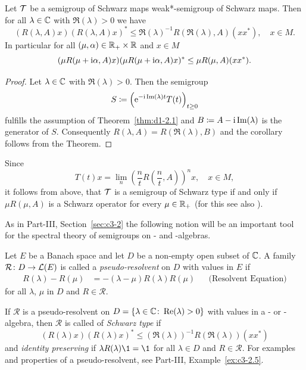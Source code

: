 \begin{corollary}\label{cor:d1-2.2}
Let $ \mathcal{T} $ be a semigroup of Schwarz maps \resp weak*-semigroup of Schwarz maps.
Then for all $ \lambda \in \mathbb{C} $ with $ \Re(\lambda)  > 0 $ we have
\[
	\left( R(\lambda,A)x \right) \left( R(\lambda,A)x \right)^{*} 
		\leq \Re(\lambda)^{-1} R(\Re(\lambda),A)(xx^{*}), \quad x \in M.
\]
In particular for all $ (\mu,\alpha) \in \mathbb{R}_{+} \times \mathbb{R} $ and $ x \in M $
\[
(\mu R(\mu + \im \alpha,A)x)(\mu R(\mu + \im \alpha,A)x)^{*} \leq \mu R(\mu,A)(xx^{*}).
\]
\end{corollary}
\begin{proof}
Let $ \lambda \in \mathbb{C} $ with $ \Re(\lambda) > 0 $.
Then the semigroup
\[
S \coloneq \left(\eu^{- \im \Im(\lambda) t}T(t) \right)_{t \geq 0}
\]
fulfills the assumption of Theorem~\ref{thm:d1-2.1} and $ B \coloneq A - \mathrm{i} \mathop{}\!\mathrm{Im}(\lambda) $ is the generator of\/ $ S $.
Consequently $ R(\lambda,A) = R(\Re(\lambda),B) $ and the corollary follows from the Theorem.
\end{proof}
\begin{remark}\label{rem:d1-2.3}
Since 
%
\[
	T(t)x = \lim_{n} \left( \frac{n}{t} R\left(\frac{n}{t}, A\right) \right)^{n} x , \quad x \in M , 
\]
%
it follows from above, that $ \mathcal{T} $ is a semigroup of Schwarz type if and only if\/ $ \mu R( \mu, A) $ is a Schwarz operator for every $ \mu \in \mathbb{R}_{+} $ (for this see also \textcite{brattelirobinson:1981}).
\end{remark}
As in Part-III, Section~\ref{sec:c3-2}  the following notion will be an important tool for the spectral theory of semigroups on \CA- and \WA-algebras.
\begin{definition}\label{def:d1-2.4}
Let $E$ be a Banach space and let $D$ be a non-empty open subset of\/ $\mathbb{C}$.
A family $ \mathcal{R} \colon D \to \mathcal{L}(E) $ is called a \emph{pseudo-resolvent} on $ D $ with values in $ E $ if
\begin{align*}
	R(\lambda) - R(\mu) &= -(\lambda - \mu)R(\lambda)R(\mu) &&\text{(Resolvent Equation)}
\end{align*}
for all $ \lambda $, $ \mu $ in $ D $ and $ R \in \mathcal{R} $.
\end{definition}
If\/ $ \mathcal{R} $ is a {pseudo-resolvent} on $ D = \{\lambda \in \mathbb{C} \colon \mathop{}\!\mathrm{Re}(\lambda) > 0\} $ with values in a \CA- or \WA-algebra, then $ \mathcal{R} $ is called of \emph{Schwarz type} 
if
\[
	(R(\lambda)x)(R(\lambda)x)^{*} \leq (\Re (\lambda) )^{-1} R(\Re(\lambda))(xx^{*})
\]
and \emph{identity preserving} if\/ $ \lambda R(\lambda)\1 = \1 $ for all $ \lambda \in D $ and $ R \in \mathcal{R} $.
For examples and properties of a pseudo-resolvent, see Part-III, Example~\ref{ex:c3-2.5}.


